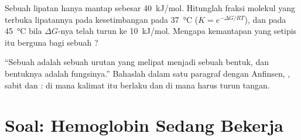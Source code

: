 \begin{exercise}[$\star\star\star$]\label{exo:b1:proteins:11}
Sebuah lipatan hanya mantap sebesar \qty{40}{kJ/mol}. Hitunglah fraksi
molekul yang terbuka lipatannya pada kesetimbangan pada
\qty{37}{\celsius} ($K = e^{-\Delta G/RT}$), dan pada
\qty{45}{\celsius} bila $\Delta G$-nya telah turun ke
\qty{10}{kJ/mol}. Mengapa kemantapan yang setipis itu berguna bagi
sebuah ?
\end{exercise}

\begin{exercise}[$\star\star\star$]\label{exo:b1:proteins:12}
``Sebuah  adalah sebuah urutan yang melipat menjadi sebuah
bentuk, dan bentuknya adalah fungsinya.'' Bahaslah dalam satu paragraf
dengan Anfinsen, ,  sabit dan : di mana
kalimat itu berlaku dan di mana  harus turun tangan.
\end{exercise}

\section{Soal: Hemoglobin Sedang Bekerja}

